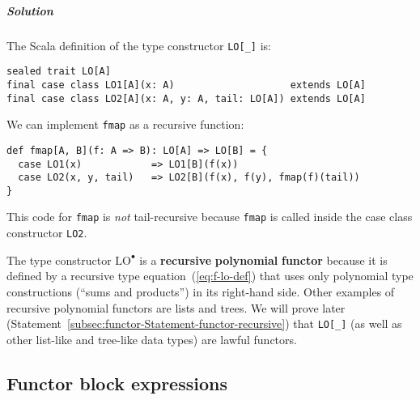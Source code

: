 \subparagraph{Solution}

The Scala definition of the type constructor \lstinline!LO[_]! is:

\begin{lstlisting}
sealed trait LO[A]
final case class LO1[A](x: A)                    extends LO[A]
final case class LO2[A](x: A, y: A, tail: LO[A]) extends LO[A]
\end{lstlisting}

We can implement \lstinline!fmap! as a recursive function:
\begin{lstlisting}
def fmap[A, B](f: A => B): LO[A] => LO[B] = {
  case LO1(x)            => LO1[B](f(x))
  case LO2(x, y, tail)   => LO2[B](f(x), f(y), fmap(f)(tail))
}
\end{lstlisting}
This code for \lstinline!fmap! is \emph{not} tail-recursive because
\lstinline!fmap! is called inside the case class constructor \lstinline!LO2!. 

The type constructor $\text{LO}^{\bullet}$ is a \textbf{recursive}
\textbf{polynomial} \textbf{functor}
because it is defined by a recursive type equation~(\ref{eq:f-lo-def})
that uses only polynomial type constructions (\textsf{``}sums and products\textsf{''})
in its right-hand side. Other examples of recursive polynomial functors
are lists and trees. We will prove later (Statement~\ref{subsec:functor-Statement-functor-recursive})
that \lstinline!LO[_]! (as well as other list-like and tree-like
data types) are lawful functors.

\subsection{Functor block expressions}

